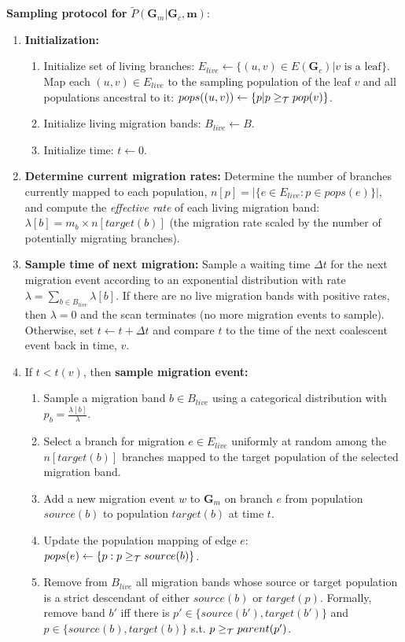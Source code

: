 \documentclass[11pt]{article}
\newcommand{\vect}[1]{\boldsymbol{\mathbf{#1}}}
\newcommand{\G}{\vect{G}}
\newcommand{\Pref}{\widetilde{P}}
\newcommand{\1}{\mathbbm{1}}
\newcommand{\Gc}{\G_c}
\newcommand{\Gm}{\G_m}
\newcommand{\migs}{\vect{m}}
\begin{document}
\noindent \textbf{Sampling protocol for } $\Pref(\Gm|\Gc,\migs)$:
%
%
\begin{enumerate}\vspace{-1em}
  \item \textbf{Initialization:}
  \begin{enumerate}
    \item \label{step:init_mapping} Initialize set of living branches: $E_{live}\leftarrow\{(u,v)\in E(\Gc)| v \text{ is a leaf}\}$. Map each $(u,v)\in E_{live}$ to the sampling population of the leaf $v$
    and all populations ancestral to it: $pops((u,v))\leftarrow\{p|p\geq_{\mathcal{T}} pop(v)\}$.
    \item Initialize living migration bands: $B_{live}\leftarrow B$.
    \item Initialize time: $t\leftarrow 0$.
 \end{enumerate}
 
  \item \label{step:interval} \textbf{Determine current migration rates:}
    Determine the number of branches currently mapped to each population, $n[p]=|\{e\in E_{live}:p\in pops(e)\}|$, and 
    compute the \emph{effective rate} of each living migration band:  $\lambda[b] = m_b\times n[target(b)]$
    (the migration rate scaled by the number of potentially migrating branches).
  \item  \label{step:deltaT} \textbf{Sample time of next migration:} 
    Sample a waiting time $\Delta t$ for the next migration event according to an exponential distribution with rate $\lambda=\sum_{b\in B_{live}}\lambda[b]$. 
    If there are no live migration bands with positive rates, then $\lambda=0$ and the scan terminates (no more migration events to sample).
    Otherwise, set $t\leftarrow t+\Delta t$ and compare $t$ to the time of the next coalescent event back in time, $v$.

  \item \label{step:sample-mig} If $t<t(v)$, then \textbf{sample migration event:}
  \begin{enumerate}
    \item \label{step:mig_band} Sample a migration band $b\in B_{live}$ using a categorical distribution with $p_b=\frac{\lambda[b]}{\lambda}$.
    \item \label{step:mig_branch} Select a branch for migration $e\in E_{live}$ uniformly at random among the $n[target(b)]$ branches mapped to the target population of the selected migration band.
    \item Add a new migration event $w$ to $\Gm$ on branch $e$ from population $source(b)$ to population $target(b)$ at time $t$.
    \item \label{step:mig_mapping} Update the population mapping of edge $e$: $pops(e)\leftarrow\{p:p\geq_{\mathcal{T}} source(b)\}$.
    \item  \label{step:ub_mig} Remove from $B_{live}$ all migration bands whose source or target population is a strict descendant of either $source(b)$ or $target(p)$.
    Formally, remove band $b'$ iff there is $p'\in\{source(b'),target(b')\}$ and $p\in\{source(b),target(b)\}$  s.t. $p\geq_{\mathcal{T}} parent(p')$.
   

\end{enumerate}
\end{enumerate}
\end{document}

